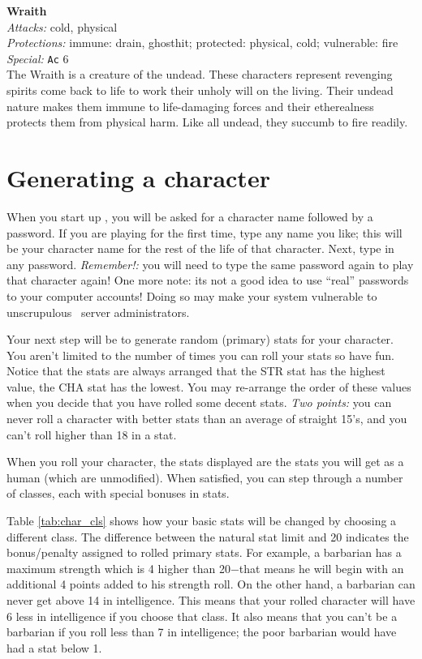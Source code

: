 \noindent{$\bullet$} {\bf Wraith} \\ 
{\sl Attacks:} cold, physical \\ 
{\sl Protections:} immune: drain, ghosthit; protected: physical, cold; vulnerable: fire \\ 
{\sl Special:} {\tt Ac} 6 \\ 
The Wraith is a creature of the undead. These characters represent revenging spirits come
back to life to work their unholy will on the living. Their undead nature 
makes them immune to life-damaging forces and their etherealness protects
them from physical harm. Like all undead, they succumb to fire readily. 

\section{Generating a character}\label{sec:char_gen}

When you start up \cf , you will be asked for a character name
followed by a password. If you are playing for the first time, type
any name you like; this will be your character name for the rest of
the life of that character. Next, type in any password. 
{\em Remember!:} 
you will need to type the same password again to play that character
again! One more note: its not a good idea to use ``real'' passwords 
to your computer accounts! Doing so may make your system vulnerable
to unscrupulous \cf\ server administrators. 

Your next step will be to generate random (primary) stats for your 
character. 
You aren't limited to the number of times you can roll your stats\emdash 
so have fun. 
Notice that the stats are always arranged that the STR stat has 
the highest value,
the CHA stat has the lowest. You may re-arrange the order of these values
when you decide that you have rolled some decent stats. 
{\em Two points:} you can 
never roll a character with better stats than an average of straight 15's, 
and you can't roll higher than 18 in a stat. 

When you roll your character, the stats displayed are the stats you 
will get as a human (which are unmodified). 
When satisfied, you can step through a number 
of classes, each with special bonuses in stats.

Table \ref{tab:char_cls} shows how your basic stats will
be changed by choosing a different class.
The difference between the natural stat limit and 20 indicates the 
bonus/penalty assigned to rolled primary stats. For example, a 
barbarian has a maximum strength which is 4 higher than 20$-$that 
means he will begin with an additional 4 points added to his
strength roll. On the other hand, a barbarian can never get above 14
in intelligence.  This means that your rolled character will have 6
less in intelligence if you choose that class.  It also means that you
can't be a barbarian if you roll less than 7 in intelligence; the
poor barbarian would have had a stat below 1.
 
